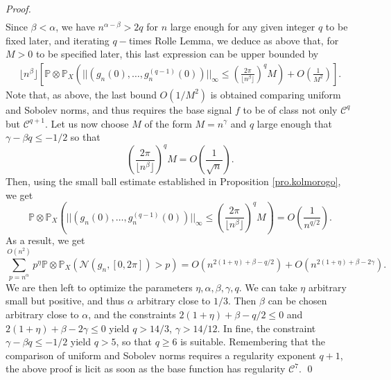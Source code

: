\documentclass{svproc}
\newcommand{\Prob}{\mathbb{P}}
\begin{document}
\begin{proof}
\begin{eqnarray*}
\end{eqnarray*} 
Since $\beta<\alpha$, we have $n^{\alpha-\beta}>2q$ for $n$ large enough for any given integer $q$ to be fixed later, and iterating $q-$times Rolle Lemma, we deduce as above that, for $M>0$ to be specified later, this last expression can be upper bounded by 
\begin{eqnarray*}
 \lfloor n^{\beta} \rfloor \left[ \Prob\otimes\Prob_X \left(  ||(g_n(0), \ldots, g_n^{(q-1)}(0)) ||_{\infty} \leq \left(\frac{2\pi}{\lfloor n^{\beta} \rfloor}\right)^q M\right)  + O\left(\frac{1}{M^2}\right) \right].
\end{eqnarray*} 
Note that, as above, the last bound $O(1/M^2)$ is obtained comparing uniform and  Sobolev norms, and thus requires the base signal $f$ to be of class not only $\mathcal C^q$ but $\mathcal C^{q+1}$.
Let us now choose $M$ of the form $M=n^{\gamma}$ and $q$ large enough that $\gamma-\beta q \leq -1/2$ so that 
\[
\left(\frac{2\pi}{\lfloor n^{\beta} \rfloor}\right)^q M = O\left(  \frac{1}{\sqrt{n}}\right).
\]
Then, using the small ball estimate established in Proposition \ref{pro.kolmorogo}, we get 
\[
\Prob\otimes\Prob_X \left(  ||(g_n(0), \ldots, g_n^{(q-1)}(0)) ||_{\infty} \leq \left(\frac{2\pi}{\lfloor n^{\beta} \rfloor}\right)^q M\right) = O\left( \frac{1}{n^{q/2}}\right). 
\]
As a result, we get 
\[
\sum_{p=n^{\alpha}}^{O(n^2)} p^{\eta} \Prob\otimes\Prob_X (\mathcal{N}(g_n,[0,2\pi])>p) = O\left(  n^{2(1+\eta)+\beta - q/2} \right)  + O\left(  n^{2(1+\eta)+\beta - 2\gamma} \right).
\]
We are then left to optimize the parameters $\eta, \alpha, \beta, \gamma, q$. We can take $\eta$ arbitrary small but positive, and thus $\alpha$ arbitrary close to $1/3$. Then $\beta$ can be chosen arbitrary close to $\alpha$, and the constraints $2(1+\eta)+\beta - q/2\leq 0$ and $2(1+\eta)+\beta - 2\gamma \leq 0$ yield $q>14/3$, $\gamma>14/12$. In fine, the constraint $\gamma-\beta q \leq -1/2$ yield $q>5$, so that $q\geq 6$ is suitable. Remembering that the comparison of uniform and Sobolev norms requires a regularity exponent $q+1$, the above proof is licit as soon as the base function has regularity $\mathcal C^{7}$.
\qed
\end{proof}
\end{document}
